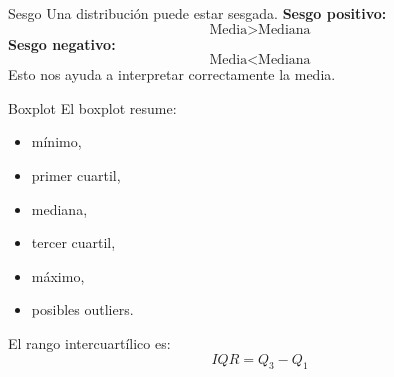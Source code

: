 \documentclass[aspectratio=169,11pt]{beamer}
\begin{document}
\begin{frame}{Sesgo}
Una distribución puede estar sesgada.
\textbf{Sesgo positivo:}
\[
\text{Media} > \text{Mediana}
\]
\textbf{Sesgo negativo:}
\[
\text{Media} < \text{Mediana}
\]
Esto nos ayuda a interpretar correctamente la media.
\end{frame}
\begin{frame}{Boxplot}
El boxplot resume:
\begin{itemize}
    \item mínimo,
    \item primer cuartil,
    \item mediana,
    \item tercer cuartil,
    \item máximo,
    \item posibles outliers.
\end{itemize}
El rango intercuartílico es:
\[
IQR = Q_3-Q_1
\]
\end{frame}
\end{document}
